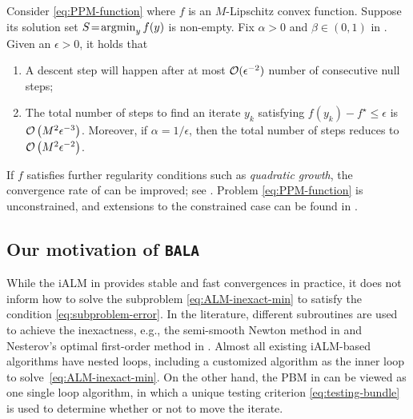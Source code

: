 \documentclass[11pt]{article}
\begin{document}
\begin{theorem}
\label{thm:convergence-bundle}
    Consider \cref{eq:PPM-function} where $f$ is an $M$-Lipschitz convex function. Suppose its solution set $ S\!=\! \operatorname*{\arg\!\min}_{y } f(y)$ is non-empty. Fix $\alpha > 0$ and $\beta \in (0,1)$ in . Given an $\epsilon > 0$, it holds that
\vspace{-12pt}
\begin{enumerate}[leftmargin=*]
\setlength{\itemsep}{0pt}
    \item A descent step will happen after at most $\mathcal{O}(\epsilon^{-2})$ number of consecutive null steps;
     \item The total number of steps to find an iterate $y_k$ satisfying $f(y_k) - f^\star \leq \epsilon$ is $\mathcal{O}\left(M^2\epsilon^{-3} \right)$. Moreover, if $\alpha = 1/\epsilon$, then the total number of steps reduces to $\mathcal{O}\left(M^2\epsilon^{-2} \right)$.
\end{enumerate}  
\end{theorem}

\vspace{-2pt}

If $f$ satisfies further regularity conditions such as \textit{quadratic growth}, the convergence rate of  can be improved; see \cite[Table 1]{diaz2023optimal}. Problem \cref{eq:PPM-function} is unconstrained, and extensions to the constrained case can be found in \cite[Lemma 2.2]{liao2023overview}. 


\subsection{Our motivation of \texttt{BALA}}
\label{subsection:motivation}
While the iALM in  provides stable and fast convergences in practice, it does not inform how to solve the subproblem \cref{eq:ALM-inexact-min} to satisfy the condition \cref{eq:subproblem-error}. In the literature, different subroutines are used to achieve the inexactness, e.g., the semi-smooth Newton method in \cite{yang2015sdpnal+,zhao2010newton} and Nesterov's optimal first-order method in \cite{lan2016iteration}. Almost all existing iALM-based algorithms have nested loops, including a customized algorithm as the inner loop to solve~\cref{eq:ALM-inexact-min}.   
%
On the other hand, the PBM in  can be viewed as one single loop algorithm, in which a unique testing criterion \cref{eq:testing-bundle} is used to determine whether or not to move the iterate.   
\end{document}
